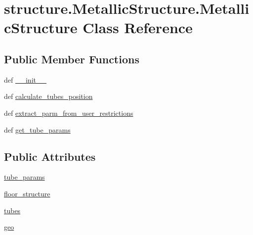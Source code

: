\hypertarget{classstructure_1_1_metallic_structure_1_1_metallic_structure}{\section{structure.\-Metallic\-Structure.\-Metallic\-Structure Class Reference}
\label{classstructure_1_1_metallic_structure_1_1_metallic_structure}
}
\subsection*{Public Member Functions}
\begin{DoxyCompactItemize}
\item 
def \hyperlink{classstructure_1_1_metallic_structure_1_1_metallic_structure_aba09cb7260d6a265cd341463fea79824}{\-\_\-\-\_\-init\-\_\-\-\_\-}
\item 
def \hyperlink{classstructure_1_1_metallic_structure_1_1_metallic_structure_a53f9b6d1af218bb7193e8e95eb35e8eb}{calculate\-\_\-tubes\-\_\-position}
\item 
def \hyperlink{classstructure_1_1_metallic_structure_1_1_metallic_structure_a1fc087c3d966209d0134dd65302b0bad}{extract\-\_\-parm\-\_\-from\-\_\-user\-\_\-restrictions}
\item 
def \hyperlink{classstructure_1_1_metallic_structure_1_1_metallic_structure_ad5738d9c8ef352045db1c518deec8323}{get\-\_\-tube\-\_\-params}
\end{DoxyCompactItemize}
\subsection*{Public Attributes}
\begin{DoxyCompactItemize}
\item 
\hyperlink{classstructure_1_1_metallic_structure_1_1_metallic_structure_a96b63377e616cb511cd40c8321dbb303}{tube\-\_\-params}
\item 
\hyperlink{classstructure_1_1_metallic_structure_1_1_metallic_structure_a2f176a6095bec9efdab69b22af62037b}{floor\-\_\-structure}
\item 
\hyperlink{classstructure_1_1_metallic_structure_1_1_metallic_structure_aa6bb26a4671d3367dd85a9f257233ea6}{tubes}
\item 
\hyperlink{classstructure_1_1_metallic_structure_1_1_metallic_structure_ac127f2d4a0611b543146a08e587cd8f6}{geo}
\end{DoxyCompactItemize}


